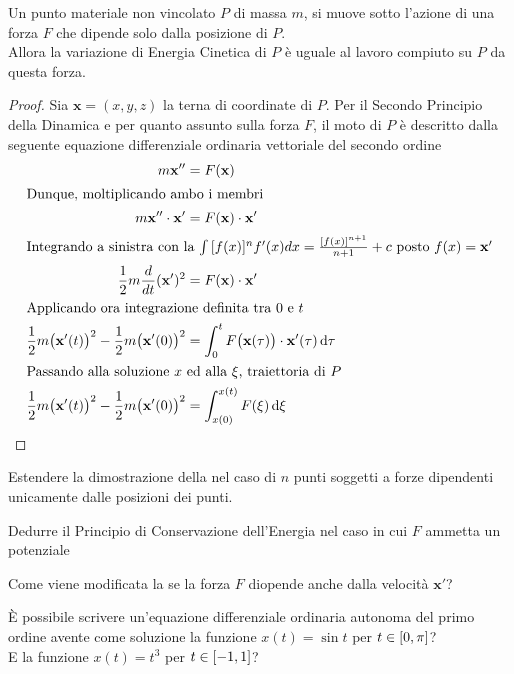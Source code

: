 \begin{proposition}
	\label{teo:ene_cinetica}
	Un punto materiale non vincolato $P$ di massa $m$, si muove sotto l'azione di una forza $F$ che dipende solo dalla posizione di $P$.\\
	Allora la variazione di Energia Cinetica di $P$ è uguale al lavoro compiuto su $P$ da questa forza.
	\begin{proof}
		Sia $\mathbf{x} = (x,y,z)$ la terna di coordinate di $P$. Per il Secondo Principio della Dinamica e per quanto assunto sulla forza $F$, il moto di $P$ è descritto dalla seguente equazione differenziale ordinaria vettoriale del secondo ordine
		\begin{align*}
			m \mathbf{x}'' &= F(\mathbf{x})\\
			\intertext{Dunque, moltiplicando ambo i membri}
			m \mathbf{x}'' \cdot \mathbf{x}' &= F(\mathbf{x}) \cdot \mathbf{x}'\\
			\intertext{Integrando a sinistra con la $\int{[f(x)]^nf'(x)dx}=\frac{[f(x)]^{n+1}}{n+1}+c$ posto $f(x) = \mathbf{x}'$}
			\frac{1}{2}m\frac{d}{dt}(\mathbf{x}')^2 &= F(\mathbf{x}) \cdot \mathbf{x}'\\
			\intertext{Applicando ora integrazione definita tra $0$ e $t$}
			\frac{1}{2}m\bigl(\mathbf{x}'(t)\bigr)^2 - \frac{1}{2}m\bigl(\mathbf{x}'(0)\bigr)^2 &= \int_0^t F\bigl(\mathbf{x}(\tau)\bigr) \cdot \mathbf{x}'(\tau) \,\mathrm{d}{\tau}\\
			\intertext{Passando alla soluzione $x$ ed alla $\xi$, traiettoria di $P$}
			\frac{1}{2}m\bigl(\mathbf{x}'(t)\bigr)^2 - \frac{1}{2}m\bigl(\mathbf{x}'(0)\bigr)^2 &= \int_{x(0)}^{x(t)} F(\xi) \,\mathrm{d}{\xi}
		\end{align*}
	\end{proof}
\end{proposition}
\begin{exercise}
	Estendere la dimostrazione della  nel caso di $n$ punti soggetti a forze dipendenti unicamente dalle posizioni dei punti.
\end{exercise}
\begin{exercise}
	Dedurre il Principio di Conservazione dell'Energia nel caso in cui $F$ ammetta un potenziale
\end{exercise}
\begin{exercise}
	Come viene modificata la  se la forza $F$ diopende anche dalla velocità $\mathbf{x}'$?
\end{exercise}
\begin{exercise}
	È possibile scrivere un'equazione differenziale ordinaria autonoma del primo ordine avente come soluzione la funzione $x(t) = \sin t$ per $t \in \left[0,\pi\right]$?\\
	E la funzione $x(t) = t^3$ per $t \in \left[-1,1\right]$?
\end{exercise}

